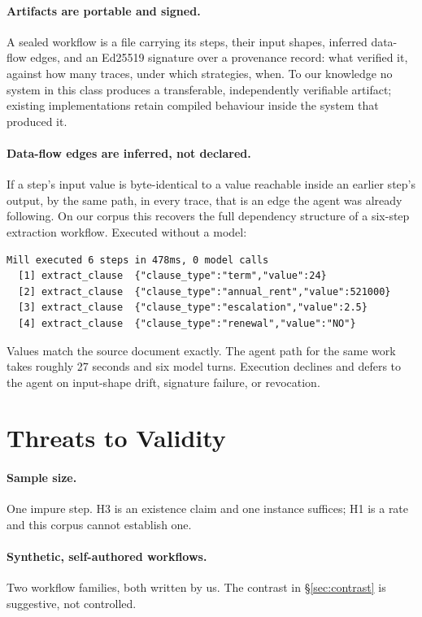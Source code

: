 \documentclass[10pt,conference]{article}
\begin{document}
\paragraph{Artifacts are portable and signed.} A sealed workflow is a file
carrying its steps, their input shapes, inferred data-flow edges, and an
Ed25519 signature over a provenance record: what verified it, against how many
traces, under which strategies, when. To our knowledge no system in this class
produces a transferable, independently verifiable artifact; existing
implementations retain compiled behaviour inside the system that produced it.

\paragraph{Data-flow edges are inferred, not declared.} If a step's input value
is byte-identical to a value reachable inside an earlier step's output, by the
same path, in every trace, that is an edge the agent was already following. On
our corpus this recovers the full dependency structure of a six-step extraction
workflow. Executed without a model:

\begin{lstlisting}
Mill executed 6 steps in 478ms, 0 model calls
  [1] extract_clause  {"clause_type":"term","value":24}
  [2] extract_clause  {"clause_type":"annual_rent","value":521000}
  [3] extract_clause  {"clause_type":"escalation","value":2.5}
  [4] extract_clause  {"clause_type":"renewal","value":"NO"}
\end{lstlisting}

\noindent Values match the source document exactly. The agent path for the same
work takes roughly 27 seconds and six model turns. Execution declines and defers
to the agent on input-shape drift, signature failure, or revocation.

\section{Threats to Validity}
\label{sec:threats}

\paragraph{Sample size.} One impure step. H3 is an existence claim and one
instance suffices; H1 is a rate and this corpus cannot establish one.

\paragraph{Synthetic, self-authored workflows.} Two workflow families, both
written by us. The contrast in \S\ref{sec:contrast} is suggestive, not
controlled.
\end{document}
